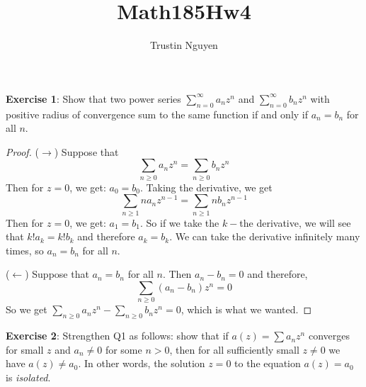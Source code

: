 \documentclass{article}
\title{Math185Hw4}
\author{Trustin Nguyen}
\begin{document}
    \maketitle

\reversemarginpar

\textbf{Exercise 1}: Show that two power series $\sum_{n = 0}^{\infty}a_{n}z^{n}$ and $\sum_{n = 0}^{\infty}b_{n}z^{n}$ with positive radius of convergence sum to the same function if and only if $a_{n} = b_{n}$ for all $n$. 
    \begin{proof}
        ($\rightarrow$) Suppose that 
            \begin{equation*}
                \sum_{n \geq 0}a_{n}z^{n} = \sum_{n \geq 0}b_{n}z^{n}
            \end{equation*}
        Then for $z = 0$, we get: $a_{0} = b_{0}$. Taking the derivative, we get 
            \begin{equation*}
                \sum_{n \geq 1} na_{n}z^{n - 1} = \sum_{n \geq 1}nb_{n}z^{n - 1}
            \end{equation*}
        Then for $z = 0$, we get: $a_{1} = b_{1}$. So if we take the $k-$the derivative, we will see that $k!a_{k} = k!b_{k}$ and therefore $a_{k} = b_{k}$. We can take the derivative infinitely many times, so $a_{n} = b_{n}$ for all $n$.

        ($\leftarrow$) Suppose that $a_{n} = b_{n}$ for all $n$. Then $a_{n} - b_{n} = 0$ and therefore,
            \begin{equation*}
                \sum_{n \geq 0} (a_{n} - b_{n})z^{n} = 0
            \end{equation*}
        So we get $\sum_{n \geq 0} a_{n}z^{n} - \sum_{n \geq 0}b_{n}z^{n} = 0$, which is what we wanted.
    \end{proof}

\newpage

\textbf{Exercise 2}: Strengthen Q1 as follows: show that if $a(z) = \sum a_{n}z^{n}$  converges for small $z$ and $a_{n} \neq 0$ for some $n > 0$, then for all sufficiently small $z \neq 0$ we have $a(z) \neq a_{0}$. In other words, the solution $z = 0$ to the equation $a(z) = a_{0}$ is \textit{isolated}.
\end{document}
